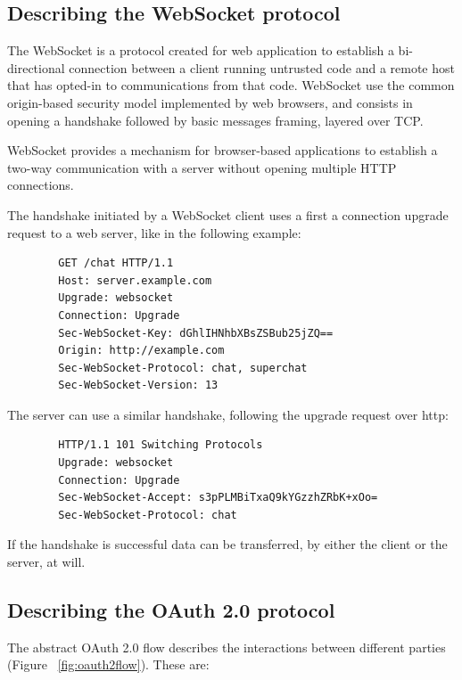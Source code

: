 \subsection{Describing the WebSocket protocol}

The WebSocket is a protocol created for web application to establish a bi-directional connection between a client running untrusted code and a remote host that has opted-in to communications from that code. 
WebSocket use the common origin-based security model implemented by web browsers, and consists in opening a handshake followed by basic messages framing, layered over TCP.

WebSocket provides a mechanism for browser-based applications to establish a two-way communication with a server without opening multiple HTTP connections.

The handshake initiated by a WebSocket client uses a first a connection upgrade request to a web server, like in the following example:

\begin{lstlisting}
        GET /chat HTTP/1.1
        Host: server.example.com
        Upgrade: websocket
        Connection: Upgrade
        Sec-WebSocket-Key: dGhlIHNhbXBsZSBub25jZQ==
        Origin: http://example.com
        Sec-WebSocket-Protocol: chat, superchat
        Sec-WebSocket-Version: 13
\end{lstlisting}

The server can use a similar handshake, following the upgrade request over http:
\begin{lstlisting}
        HTTP/1.1 101 Switching Protocols
        Upgrade: websocket
        Connection: Upgrade
        Sec-WebSocket-Accept: s3pPLMBiTxaQ9kYGzzhZRbK+xOo=
        Sec-WebSocket-Protocol: chat
\end{lstlisting}

If the handshake is successful data can be transferred, by either the client or the server, at will.

\subsection{Describing the OAuth 2.0 protocol}

The abstract OAuth 2.0 flow describes the interactions between different parties (Figure ~\ref{fig:oauth2flow}). These are:

